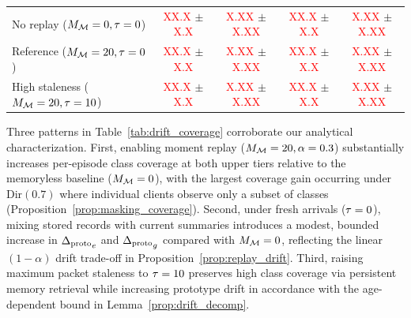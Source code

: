 \begin{table}[t]
\begin{tabular*}{\textwidth}{@{\extracolsep{\fill}}lcccc@{}}
No replay ($M_{\mathcal{M}}=0, \tau=0$)
& \textcolor{red}{XX.X} {\scriptsize $\pm$ \textcolor{red}{X.X}}
& \textcolor{red}{X.XX} {\scriptsize $\pm$ \textcolor{red}{X.XX}}
& \textcolor{red}{XX.X} {\scriptsize $\pm$ \textcolor{red}{X.X}}
& \textcolor{red}{X.XX} {\scriptsize $\pm$ \textcolor{red}{X.XX}} \\

Reference ($M_{\mathcal{M}}=20, \tau=0$)
& \textcolor{red}{XX.X} {\scriptsize $\pm$ \textcolor{red}{X.X}}
& \textcolor{red}{X.XX} {\scriptsize $\pm$ \textcolor{red}{X.XX}}
& \textcolor{red}{XX.X} {\scriptsize $\pm$ \textcolor{red}{X.X}}
& \textcolor{red}{X.XX} {\scriptsize $\pm$ \textcolor{red}{X.XX}} \\

High staleness ($M_{\mathcal{M}}=20, \tau=10$)
& \textcolor{red}{XX.X} {\scriptsize $\pm$ \textcolor{red}{X.X}}
& \textcolor{red}{X.XX} {\scriptsize $\pm$ \textcolor{red}{X.XX}}
& \textcolor{red}{XX.X} {\scriptsize $\pm$ \textcolor{red}{X.X}}
& \textcolor{red}{X.XX} {\scriptsize $\pm$ \textcolor{red}{X.XX}} \\

\bottomrule
\end{tabular*}
\end{table}

Three patterns in Table~\ref{tab:drift_coverage} corroborate our analytical characterization. First, enabling moment replay ($M_{\mathcal{M}}=20, \alpha=0.3$) substantially increases per-episode class coverage at both upper tiers relative to the memoryless baseline ($M_{\mathcal{M}}=0$), with the largest coverage gain occurring under $\mathrm{Dir}(0.7)$ where individual clients observe only a subset of classes (Proposition~\ref{prop:masking_coverage}). Second, under fresh arrivals ($\tau=0$), mixing stored records with current summaries introduces a modest, bounded increase in ${\Delta_{\mathrm{proto}}}_e$ and ${\Delta_{\mathrm{proto}}}_g$ compared with $M_{\mathcal{M}}=0$, reflecting the linear $(1-\alpha)$ drift trade-off in Proposition~\ref{prop:replay_drift}. Third, raising maximum packet staleness to $\tau=10$ preserves high class coverage via persistent memory retrieval while increasing prototype drift in accordance with the age-dependent bound in Lemma~\ref{prop:drift_decomp}.


